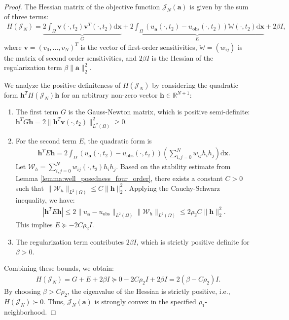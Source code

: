 \documentclass[10pt,a4paper]{amsart}
\begin{document}
\begin{proof}
	The Hessian matrix of the objective function $\mathcal{J}_N(\mathbf{a})$ is given by the sum of three terms:
	\begin{align*}
		H(\mathcal{J}_N) = \underbrace{2 \int_{\Omega} \mathbf{v}(\cdot,t_2) \mathbf{v}^T(\cdot,t_2) \mathrm{d}\mathbf{x}}_{G} + \underbrace{2 \int_{\Omega} (u_{\mathbf{a}}(\cdot,t_2) - u_{\text{obs}}(\cdot,t_2)) \mathbb{W}(\cdot,t_2) \mathrm{d}\mathbf{x}}_{E} + 2\beta I,
	\end{align*}
	where $\mathbf{v} = (v_0, \dots, v_N)^T$ is the vector of first-order sensitivities, $\mathbb{W} = (w_{ij})$ is the matrix of second order sensitivities, and $2\beta I$ is the Hessian of the regularization term $\beta \|\mathbf{a}\|_2^2$.
	
	We analyze the positive definiteness of $H(\mathcal{J}_N)$ by considering the quadratic form $\mathbf{h}^T H(\mathcal{J}_N) \mathbf{h}$ for an arbitrary non-zero vector $\mathbf{h} \in \mathbb{R}^{N+1}$:
	\begin{enumerate}
		\item The first term $G$ is the Gauss-Newton matrix, which is positive semi-definite: $\mathbf{h}^T G \mathbf{h} = 2 \|\mathbf{h}^T \mathbf{v}(\cdot,t_2)\|_{L^2(\Omega)}^2 \geq 0$.
		\item For the second term $E$, the quadratic form is 
		\begin{align*}
			\mathbf{h}^T E \mathbf{h} = 2 \int_{\Omega} (u_{\mathbf{a}}(\cdot,t_2) - u_{\text{obs}}(\cdot,t_2)) \left(\sum_{i,j=0}^N w_{ij} h_i h_j\right) \mathrm{d}\mathbf{x}.
		\end{align*}
		Let $\mathcal{W}_h = \sum_{i,j=0}^N w_{ij}(\cdot,t_2) h_i h_j$. Based on the stability estimate from Lemma \ref{lemma:well_posedness_four_order}, there exists a constant $C > 0$ such that $\|\mathcal{W}_h\|_{L^2(\Omega)} \leq C \|\mathbf{h}\|_2^2$. Applying the Cauchy-Schwarz inequality, we have:
		\begin{align*}
			|\mathbf{h}^T E \mathbf{h}| \leq 2 \|u_{\mathbf{a}} - u_{\text{obs}}\|_{L^2(\Omega)} \|\mathcal{W}_h\|_{L^2(\Omega)} \leq 2 \rho_2 C \|\mathbf{h}\|_2^2.
		\end{align*}
		This implies $E \succeq -2C\rho_2 I$.
		\item The regularization term contributes $2\beta I$, which is strictly positive definite for $\beta > 0$.
	\end{enumerate}
	
	Combining these bounds, we obtain:
	\begin{align*}
		H(\mathcal{J}_N) = G + E + 2\beta I \succeq 0 - 2C\rho_2 I + 2\beta I = 2(\beta - C\rho_2) I.
	\end{align*}
	By choosing $\beta > C\rho_2$, the eigenvalue of the Hessian is strictly positive, i.e., $H(\mathcal{J}_N) \succ 0$. Thus, $\mathcal{J}_N(\mathbf{a})$ is strongly convex in the specified $\rho_1$-neighborhood.
\end{proof}
\end{document}

